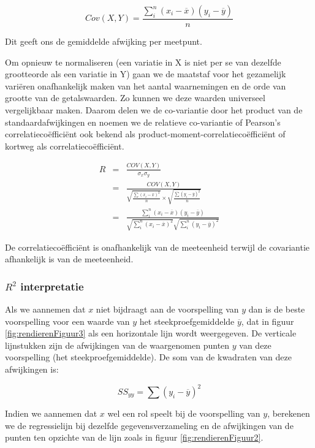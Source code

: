 \begin{equation}
  Cov(X,Y) = \frac{\sum_{i}^{n}(x_{i} - \overline{x}) (y_{i} - \overline{y})}{n}
  \label{eq:covariantie}
\end{equation}

Dit geeft ons de gemiddelde afwijking per meetpunt.

Om opnieuw te normaliseren (een variatie in X is niet per se van dezelfde grootteorde als een variatie in Y) gaan we de maatstaf voor het gezamelijk vari\"eren onafhankelijk maken van het aantal waarnemingen en de orde van grootte van de getalswaarden. Zo kunnen we deze waarden universeel vergelijkbaar maken. Daarom delen we de co-variantie door het product van de standaardafwijkingen en noemen we de relatieve co-variantie of Pearson's correlatieco\"effici\"ent ook bekend als product-moment-correlatieco\"effici\"ent of kortweg als correlatieco\"effici\"ent.

\begin{eqnarray}
  R &=&\frac{COV(X,Y)}{\sigma_{x}\sigma_{y}} \\
  &=& \frac{COV(X,Y)}{\sqrt{\frac{\sum(x_{i} - \overline{x})^{2}}{n}} \times \sqrt{\frac{\sum(y_{i} - \overline{y})^{2}}{n}}} \\
  &=& \frac{\sum_{i}^{n}(x_{i}-\overline{x})(y_{i} - \overline{y})}{\sqrt{\sum_{i}^{n} (x_{i}-\overline{x})^{2}} \sqrt{\sum_{i}^{n} (y_{i}-\overline{y})^{2}}}
  \label{eq:relCovar}
\end{eqnarray}

De correlatieco\"effici\"ent is onafhankelijk van de meeteenheid terwijl de covariantie afhankelijk is van de meeteenheid.

\subsubsection{$R^{2}$ interpretatie}
Als we aannemen dat $x$ niet bijdraagt aan de voorspelling van $y$ dan is de beste voorspelling voor een waarde van $y$ het steekproefgemiddelde $\overline{y}$, dat in figuur \ref{fig:rendierenFiguur3} als een horizontale lijn wordt weergegeven. De verticale lijnstukken zijn de afwijkingen van de waargenomen punten $y$ van deze voorspelling (het steekproefgemiddelde). De som van de kwadraten van deze afwijkingen is:

\[ SS_{yy} = \sum(y_{i} - \overline{y})^{2} \]

Indien we aannemen dat $x$ wel een rol speelt bij de voorspelling van $y$, berekenen we de regressielijn bij dezelfde gegevensverzameling en de afwijkingen van de punten ten opzichte van de lijn zoals in figuur \ref{fig:rendierenFiguur2}.

